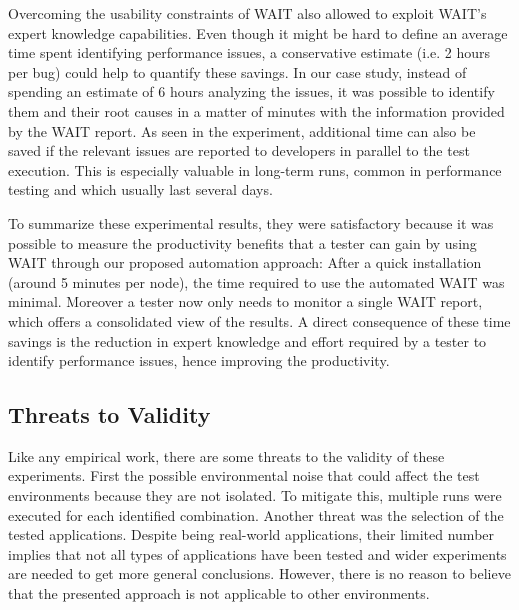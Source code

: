 \documentclass[runningheads,a4paper]{llncs}
\begin{document}
Overcoming the usability constraints of WAIT also allowed to exploit
WAIT's expert knowledge capabilities. Even though it might be hard to define an
average time spent identifying performance issues, a conservative estimate (i.e.
2 hours per bug) could help to quantify these savings. In our case study,
instead of spending an estimate of 6 hours analyzing the issues, it was possible to
identify them and their root causes in a matter of minutes with the information
provided by the WAIT report. As seen in the experiment, additional time can
also be saved if the relevant issues are reported to developers in parallel to
the test execution. This is especially valuable in long-term runs, common in performance
testing and which usually last several days.

To summarize these experimental results, they were satisfactory because it was
possible to measure the productivity benefits that a tester can gain by using
WAIT through our proposed automation approach: After a quick installation
(around 5 minutes per node), the time required to use the automated WAIT was
minimal. Moreover a tester now only needs to monitor a single WAIT report, which
offers a consolidated view of the results. A direct consequence of these
time savings is the reduction in expert knowledge and effort required by a
tester to identify performance issues, hence improving the productivity.

\vspace{-7pt}
\subsection{Threats to Validity}
\vspace{-7pt}
Like any empirical work, there are some threats to the validity of these
experiments. First the possible environmental noise that could affect the test
environments because they are not isolated. To mitigate this, multiple runs were
executed for each identified combination. Another threat was the selection of
the tested applications. Despite being real-world applications, their limited
number implies that not all types of applications have been tested and wider
experiments are needed to get more general conclusions. However, there is no
reason to believe that the presented approach is not applicable to other
environments.

\vspace{-7pt}
\end{document}
